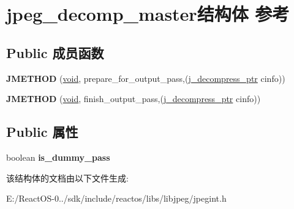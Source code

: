 \hypertarget{structjpeg__decomp__master}{}\section{jpeg\+\_\+decomp\+\_\+master结构体 参考}
\label{structjpeg__decomp__master}
\subsection*{Public 成员函数}
\begin{DoxyCompactItemize}
\item 
\mbox{\label{structjpeg__decomp__master_ab0e51667ba436fad82e7cf95b1bd4120}} 
{\bfseries J\+M\+E\+T\+H\+OD} (\hyperlink{interfacevoid}{void}, prepare\+\_\+for\+\_\+output\+\_\+pass,(\hyperlink{structjpeg__decompress__struct}{j\+\_\+decompress\+\_\+ptr} cinfo))
\item 
\mbox{\label{structjpeg__decomp__master_a7dec615b828e443ddddf99078d1edb9a}} 
{\bfseries J\+M\+E\+T\+H\+OD} (\hyperlink{interfacevoid}{void}, finish\+\_\+output\+\_\+pass,(\hyperlink{structjpeg__decompress__struct}{j\+\_\+decompress\+\_\+ptr} cinfo))
\end{DoxyCompactItemize}
\subsection*{Public 属性}
\begin{DoxyCompactItemize}
\item 
\mbox{\label{structjpeg__decomp__master_a93cbde036bd87ab00b0ac8214e27bbe1}} 
boolean {\bfseries is\+\_\+dummy\+\_\+pass}
\end{DoxyCompactItemize}


该结构体的文档由以下文件生成\+:\begin{DoxyCompactItemize}
\item 
E\+:/\+React\+O\+S-\/0../sdk/include/reactos/libs/libjpeg/jpegint.\+h\end{DoxyCompactItemize}
